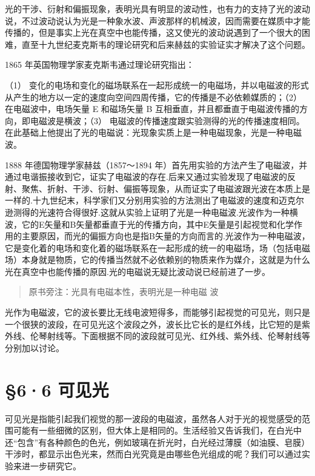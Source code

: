 光的干涉、衍射和偏振现象，表明光具有明显的波动性，也有力的支持了光的波动说，不过波动说认为光是一种象水波、声波那样的机械波，因而需要在媒质中才能传播的，但是事实上光在真空中也能传播，这又使光的波动说遇到了一个很大的困难，直至十九世纪麦克斯韦的理论研究和后来赫兹的实验证实才解决了这个问题。

1865 年英国物理学家麦克斯韦通过理论研究指出：

（1）
变化的电场和变化的磁场联系在一起形成统一的电磁场，并以电磁波的形式从产生的地方以一定的速度向空间四周传播，它的传播是不必依赖媒质的；（2）
在电磁波中，电场矢量 E 和磁场矢量 B
互相垂直，并且都垂直于电磁波传播的方向，即电磁波是横波；（3）
电磁波的传播速度跟实验测得的光的传播速度相同。在此基础上他提出了光的电磁说：光现象实质上是一种电磁现象，光是一种电磁波。

1888 年德国物理学家赫兹（1857～1894
年）首先用实验的方法产生了电磁波，并通过电谐振接收到它，证实了电磁波的存在.后来又通过实验发现了电磁波的反射、聚焦、折射、干涉、衍射、偏振等现象，从而证实了电磁波跟光波在本质上是一样的.十九世纪末，科学家们又分别用实验的方法测出了电磁波的速度和迈克尔逊测得的光速符合得很好.这就从实验上证明了光是一种电磁波.光波作为一种横波，它的E矢量和B矢量都垂直于光的传播方向，其中E矢量是引起视觉和化学作用的主要原因，而光的偏振方向也是指B矢量的方向而言的.光波作为一种电磁波，它是变化着的电场和变化着的磁场联系在一起形成的统一的电磁场，场（包括电磁场）本身就是物质，它的传播当然就不必依赖别的物质来作为媒介，这就是为什么光在真空中也能传播的原因.光的电磁说无疑比波动说已经前进了一步。

\begin{quote}
原书旁注：光具有电磁本性，表明光是一种电磁 波
\end{quote}

光作为电磁波，它的波长要比无线电波短得多，而能够引起视觉的可见光，则只是一个很狭的波段，在可见光这个波段之外，波长比它长的是红外线，比它短的是紫外线、伦琴射线等。下面根据不同的波段就可见光、红外线、紫外线、伦琴射线等分别加以讨论。

\section{§6·6 可见光}

可见光是指能引起我们视觉的那一波段的电磁波，虽然各人对于光的视觉感受的范围可能有一些细微的区别，但大体上是相同的。生活经验又告诉我们，在白光中还``包含''有各种颜色的色光，例如玻璃在折光时，白光经过薄膜（如油膜、皂膜）干涉时，都显示出色光来，然而白光究竟是由哪些色光组成的呢？我们可以通过实验来进一步研究它。

